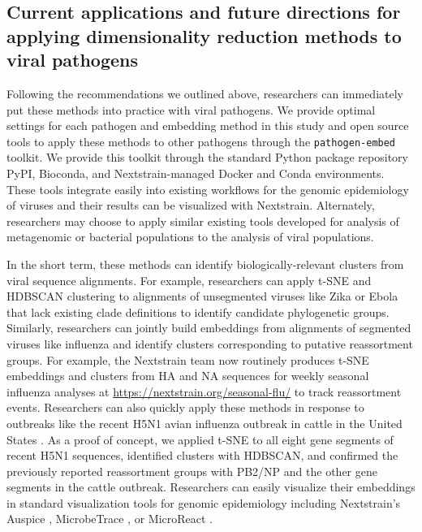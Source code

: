 \documentclass[webpdf,contemporary,large,single]{oup-authoring-template}%
\theoremstyle{thmstyleone}%
\theoremstyle{thmstyletwo}%
\theoremstyle{thmstylethree}%
\begin{document}
\subsection{Current applications and future directions for applying dimensionality reduction methods to viral pathogens}

Following the recommendations we outlined above, researchers can immediately put these methods into practice with viral pathogens.
We provide optimal settings for each pathogen and embedding method in this study and open source tools to apply these methods to other pathogens through the \texttt{pathogen-embed} toolkit.
We provide this toolkit through the standard Python package repository PyPI, Bioconda, and Nextstrain-managed Docker and Conda environments.
These tools integrate easily into existing workflows for the genomic epidemiology of viruses and their results can be visualized with Nextstrain.
Alternately, researchers may choose to apply similar existing tools developed for analysis of metagenomic or bacterial populations \citep{Schloss2009,Schloss2020,Bolyen2019,McMurdie2013,Lees2019} to the analysis of viral populations.

In the short term, these methods can identify biologically-relevant clusters from viral sequence alignments.
For example, researchers can apply t-SNE and HDBSCAN clustering to alignments of unsegmented viruses like Zika or Ebola that lack existing clade definitions to identify candidate phylogenetic groups.
Similarly, researchers can jointly build embeddings from alignments of segmented viruses like influenza and identify clusters corresponding to putative reassortment groups.
For example, the Nextstrain team now routinely produces t-SNE embeddings and clusters from HA and NA sequences for weekly seasonal influenza analyses at \url{https://nextstrain.org/seasonal-flu/} to track reassortment events.
Researchers can also quickly apply these methods in response to outbreaks like the recent H5N1 avian influenza outbreak in cattle in the United States \citep{Nguyen2024}.
As a proof of concept, we applied t-SNE to all eight gene segments of recent H5N1 sequences, identified clusters with HDBSCAN, and confirmed the previously reported reassortment groups with PB2/NP and the other gene segments in the cattle outbreak.
Researchers can easily visualize their embeddings in standard visualization tools for genomic epidemiology including Nextstrain's Auspice \citep{Hadfield2018}, MicrobeTrace \citep{Campbell2021}, or MicroReact \citep{Argimon2016}.
\end{document}
